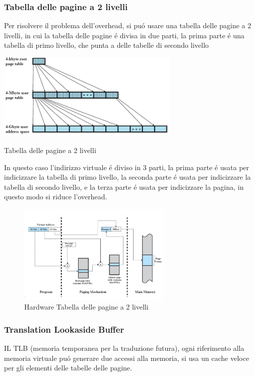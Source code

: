     \subsubsection*{Tabella delle pagine a 2 livelli}
    Per risolvere il problema dell'overhead, si puó usare una tabella delle pagine a 2 livelli, in cui la tabella delle
    pagine é divisa in due parti, la prima parte é una tabella di primo livello, che punta a delle tabelle di secondo livello
    \begin{Figure}
        \centering
        \includegraphics[width=0.65\textwidth]{immagini/TabellaA2Livelli}
        \caption{Tabella delle pagine a 2 livelli}
    \end{Figure}
    In questo caso l'indirizzo virtuale é diviso in 3 parti, la prima parte é usata per indicizzare la tabella di primo livello,
    la seconda parte é usata per indicizzare la tabella di secondo livello, e la terza parte é usata per indicizzare
    la pagina, in questo modo si riduce l'overhead.
    \begin{figure}
        \centering
        \includegraphics[width=0.65\textwidth]{immagini/HardwareTabella2Livelli}
        \caption{Hardware Tabella delle pagine a 2 livelli}
    \end{figure}
    \subsubsection{Translation Lookaside Buffer}
    IL TLB (memoria temporanea per la traduzione futura), ogni riferimento alla memoria virtuale puó generare
    due accessi alla memoria, si usa un cache veloce per gli elementi delle tabelle delle pagine.
